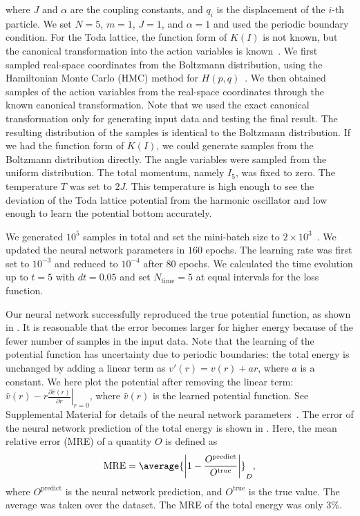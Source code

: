 where $J$ and $\alpha$ are the coupling constants, and $q_i$ is the displacement of the $i$-th particle. We set $N=5$, $m=1$, $J = 1$, and $\alpha = 1$ and used the periodic boundary condition.
For the Toda lattice, the function form of $K(I)$ is not known, but the canonical transformation into the action variables is known~\cite{Flaschka-McLaughlin1976,Flaschka1974,Kappelerf-Henricit2008,Henrici2015}.
We first sampled real-space coordinates from the Boltzmann distribution, using the Hamiltonian Monte Carlo (HMC) method for $H(p,q)$~\cite{Duane-etal-1987,mcmc-handbook2011}.
We then obtained samples of the action variables from the real-space coordinates through the known canonical transformation.
Note that we used the exact canonical transformation only for generating input data and testing the final result.
The resulting distribution of the samples is identical to the Boltzmann distribution.
If we had the function form of $K(I)$, we could generate samples from the Boltzmann distribution directly.
The angle variables were sampled from the uniform distribution.
The total momentum, namely $I_5$, was fixed to zero.
The temperature $T$ was set to $2J$.
This temperature is high enough to see the deviation of the Toda lattice potential from the harmonic oscillator and low enough to learn the potential bottom accurately.

We generated $10^5$ samples in total and set the mini-batch size to $2 \times 10^3$~\cite{our_supplemental_material}. We updated the neural network parameters in $160$ epochs.
The learning rate was first set to $10^{-3}$ and reduced to $10^{-4}$ after $80$ epochs.
We calculated the time evolution up to $t = 5$ with $dt = 0.05$ and set $N_\mathrm{time}=5$ at equal intervals for the loss function.

Our neural network successfully reproduced the true potential function, as shown in . It is reasonable that the error becomes larger for higher energy because of the fewer number of samples in the input data.
Note that the learning of the potential function has uncertainty due to periodic boundaries: the total energy is unchanged by adding a linear term as $v'(r) = v(r) + a r$, where $a$ is a constant.
We here plot the potential after removing the linear term: $ \hat{v}(r) - r\left.\frac{\partial \hat{v}(r)}{\partial r}\right|_{r=0}$, where $\hat{v}(r)$ is the learned potential function. See Supplemental Material for details of the neural network parameters~\cite{our_supplemental_material}.
The error of the neural network prediction of the total energy is shown in . Here, the mean relative error (MRE) of a quantity $O$ is defined as
\begin{align}
  \mathrm{MRE} = \average{\left|1 - \frac{O^{\mathrm{predict}}}{O^{\mathrm{true}}}\right|}_{D}, \label{eq:mean_relative_error}
\end{align}
where $O^{\mathrm{predict}}$ is the neural network prediction, and $O^{\mathrm{true}}$ is the true value. The average was taken over the dataset.
The MRE of the total energy was only 3\%.

